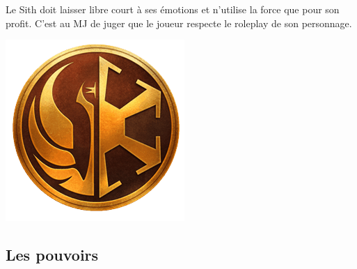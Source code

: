 Le Sith doit laisser libre court à ses émotions et n'utilise la force que pour son profit. C'est au MJ de juger que le joueur respecte le roleplay de son personnage.

\begin{center}
	\vspace*{\fill}
	\includegraphics[width=\linewidth]{img/pouvoirs/jedi-sith.png}
	\vspace*{\fill}
\end{center}

\clearpage
\subsection{Les pouvoirs}

